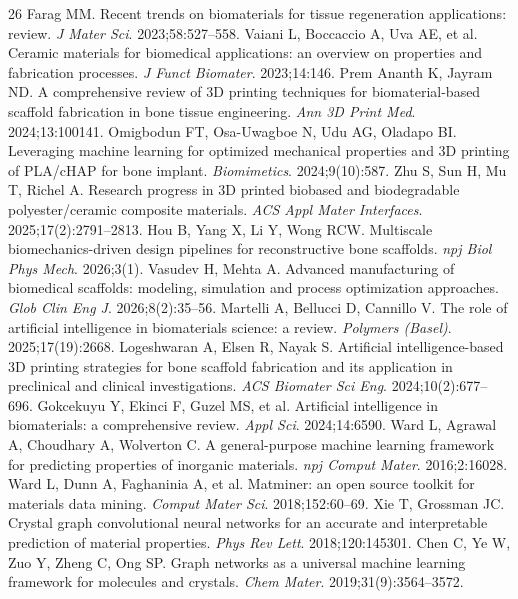 \documentclass[review,11pt,a4paper]{elsarticle}
\begin{document}
\begin{thebibliography}{26}
 Farag MM. Recent trends on biomaterials for tissue regeneration applications: review. \textit{J Mater Sci}. 2023;58:527--558.
 Vaiani L, Boccaccio A, Uva AE, et al. Ceramic materials for biomedical applications: an overview on properties and fabrication processes. \textit{J Funct Biomater}. 2023;14:146.
 Prem Ananth K, Jayram ND. A comprehensive review of 3D printing techniques for biomaterial-based scaffold fabrication in bone tissue engineering. \textit{Ann 3D Print Med}. 2024;13:100141.
 Omigbodun FT, Osa-Uwagboe N, Udu AG, Oladapo BI. Leveraging machine learning for optimized mechanical properties and 3D printing of PLA/cHAP for bone implant. \textit{Biomimetics}. 2024;9(10):587.
 Zhu S, Sun H, Mu T, Richel A. Research progress in 3D printed biobased and biodegradable polyester/ceramic composite materials. \textit{ACS Appl Mater Interfaces}. 2025;17(2):2791--2813.
 Hou B, Yang X, Li Y, Wong RCW. Multiscale biomechanics-driven design pipelines for reconstructive bone scaffolds. \textit{npj Biol Phys Mech}. 2026;3(1).
 Vasudev H, Mehta A. Advanced manufacturing of biomedical scaffolds: modeling, simulation and process optimization approaches. \textit{Glob Clin Eng J}. 2026;8(2):35--56.
 Martelli A, Bellucci D, Cannillo V. The role of artificial intelligence in biomaterials science: a review. \textit{Polymers (Basel)}. 2025;17(19):2668.
 Logeshwaran A, Elsen R, Nayak S. Artificial intelligence-based 3D printing strategies for bone scaffold fabrication and its application in preclinical and clinical investigations. \textit{ACS Biomater Sci Eng}. 2024;10(2):677--696.
 Gokcekuyu Y, Ekinci F, Guzel MS, et al. Artificial intelligence in biomaterials: a comprehensive review. \textit{Appl Sci}. 2024;14:6590.
 Ward L, Agrawal A, Choudhary A, Wolverton C. A general-purpose machine learning framework for predicting properties of inorganic materials. \textit{npj Comput Mater}. 2016;2:16028.
 Ward L, Dunn A, Faghaninia A, et al. Matminer: an open source toolkit for materials data mining. \textit{Comput Mater Sci}. 2018;152:60--69.
 Xie T, Grossman JC. Crystal graph convolutional neural networks for an accurate and interpretable prediction of material properties. \textit{Phys Rev Lett}. 2018;120:145301.
 Chen C, Ye W, Zuo Y, Zheng C, Ong SP. Graph networks as a universal machine learning framework for molecules and crystals. \textit{Chem Mater}. 2019;31(9):3564--3572.

\end{thebibliography}
\end{document}
